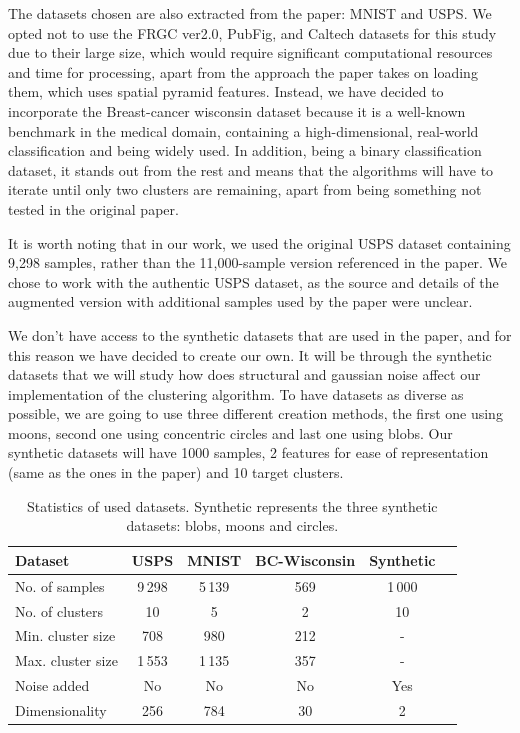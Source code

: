 \documentclass[
	10pt,
	parskip=half-,	
	paper=a4,
	english
	]{scrartcl}
\begin{document}
The datasets chosen are also extracted from the paper: MNIST and USPS. We opted not to use the FRGC ver2.0, PubFig, and Caltech datasets for this study due to their large size, which would require significant computational resources and time for processing, apart from the approach the paper takes on loading them, which uses spatial pyramid features. Instead, we have decided to incorporate the Breast-cancer wisconsin dataset because it is a well-known benchmark in the medical domain, containing a high-dimensional, real-world classification and being widely used. In addition, being a binary classification dataset, it stands out from the rest and means that the algorithms will have to iterate until only two clusters are remaining, apart from being something not tested in the original paper.

It is worth noting that in our work, we used the original USPS dataset containing 9,298 samples, rather than the 11,000-sample version referenced in the paper. We chose to work with the authentic USPS dataset, as the source and details of the augmented version with additional samples used by the paper were unclear.

We don't have access to the synthetic datasets that are used in the paper, and for this reason we have decided to create our own. It will be through the synthetic datasets that we will study how does structural and gaussian noise affect our implementation of the clustering algorithm. To have datasets as diverse as possible, we are going to use three different creation methods, the first one using moons, second one using concentric circles and last one using blobs. Our synthetic datasets will have 1000 samples, 2 features for ease of representation (same as the ones in the paper) and 10 target clusters.

\begin{table}[h]
\centering
\caption{Statistics of used datasets. Synthetic represents the three synthetic datasets: blobs, moons and circles.}
\begin{tabular}{lccccc}
\toprule
\textbf{Dataset} & \textbf{USPS} & \textbf{MNIST} & \textbf{BC-Wisconsin} & \textbf{Synthetic}\\
\midrule
No. of samples     & 9\,298 & 5\,139 & 569 & 1\,000 \\
No. of clusters    & 10     & 5     & 2    & 10   \\
Min. cluster size  & 708   & 980   & 212     & - \\
Max. cluster size  & 1\,553   & 1\,135  & 357     & - \\
Noise added  & No   & No  & No     & Yes \\
Dimensionality     & 256    & 784   & 30   & 2 \\
\bottomrule
\end{tabular}
\end{table}
\end{document}
